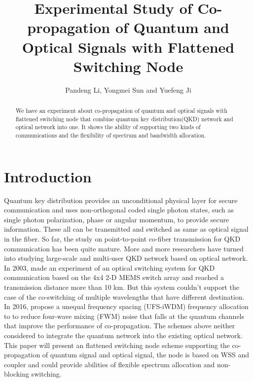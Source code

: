 \documentclass[letterpaper,10pt]{article}
\begin{document}
\title{Experimental Study of Co-propagation of Quantum and Optical Signals with Flattened Switching Node}
\author{Pandeng Li, Yongmei Sun and Yuefeng Ji}
\address{State Key Laboratory of Information Photonics and Optical Communications, School of Information and Telecommunication Engineering, BUPT Beijing, China, 100876}

\begin{abstract}
We have an experiment about co-propagation of quantum and optical signals with flattened switching node that combine quantum key distribution(QKD) network and optical network into one. It shows the ability of supporting two kinds of communications and the flexibility of spectrum and bandwidth allocation.
\end{abstract}

\section{Introduction}

Quantum key distribution provides an unconditional physical layer for secure communication and uses non-orthogonal coded single photon states, such as single photon polarization, phase or angular momentum, to provide secure information. These all can be transmitted and switched as same as optical signal in the fiber. So far, the study on point-to-point co-fiber transmission for QKD communication has been quite mature. More and more researchers have turned into studying large-scale and multi-user QKD network based on optical network. In 2003, \cite{ToliverPaul} made an experiment of an optical switching system for QKD communication based on the 4x4 2-D MEMS switch array and reached a transmission distance more than 10 km. But this system couldn't support the case of the co-switching of multiple wavelengths that have different destination. In 2016, \cite{YongmeiSun} propose a unequal frequency spacing (UFS-iWDM) frequency allocation to to reduce four-wave mixing (FWM) noise that falls at the quantum channels that improve the performance of co-propagation. The schemes above neither considered to integrate the quantum network into the existing optical network. This paper will present an flattened switching node scheme supporting the co-propagation of quantum signal and optical signal, the node is based on WSS and coupler and could provide abilities of flexible spectrum allocation and non-blocking switching.
\end{document}
